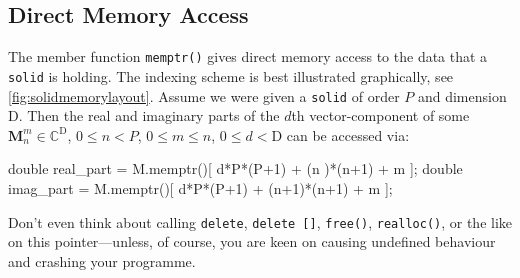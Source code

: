 \documentclass{scrbook}
\newcommand{\complex}{\mathbb{C}}
\newcommand{\vv}[1]{\ensuremath{\symbf{#1}}} %
\begin{document}
\subsection{Direct Memory Access}
The member function \lstinline|memptr()| gives direct memory access to the
data that a \lstinline|solid| is holding. The indexing scheme is best
illustrated graphically, see \cref{fig:solidmemorylayout}. Assume we were given
a \lstinline|solid| of order $P$ and dimension $\mathrm{D}$. Then the real
and imaginary parts of the $d$th vector-component of some
$\vv{M}_n^m\in\complex^{\mathrm{D}}$, $0\leq n < P$, $0\leq m\leq n$,
$0\leq d<\mathrm{D}$ can be accessed via:
\begin{cppcode*}
double real_part = M.memptr()[ d*P*(P+1) + (n  )*(n+1) + m ];
double imag_part = M.memptr()[ d*P*(P+1) + (n+1)*(n+1) + m ];
\end{cppcode*}

Don't even think about calling \lstinline|delete|, \lstinline|delete []|,
\lstinline|free()|, \lstinline|realloc()|, or the like on this 
pointer---unless, of course, you are keen on causing undefined behaviour and
crashing your programme.
\end{document}

